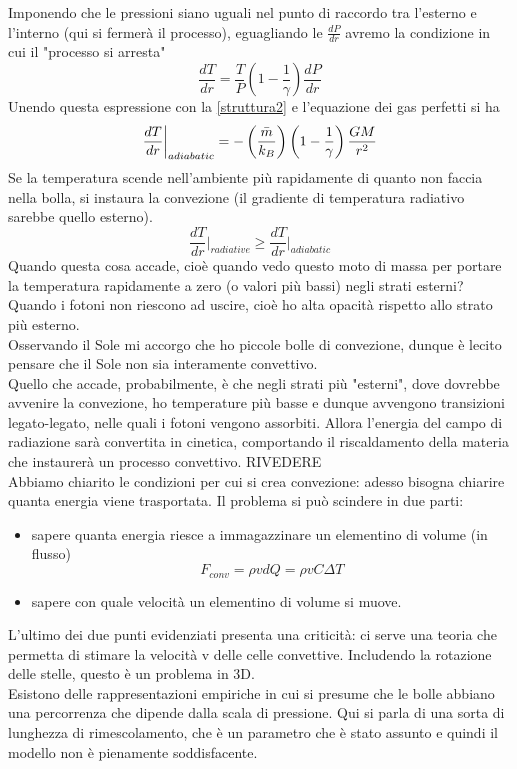 \documentclass[a4paper,11pt]{article}
\begin{document}
Imponendo che le pressioni siano uguali nel punto di raccordo tra l'esterno e l'interno (qui si fermerà il processo), eguagliando le $\frac{dP}{dr}$ avremo la condizione in cui il "processo si arresta"
$$\frac{dT}{dr}=\frac{T}{P}\left(1-\frac{1}{\gamma}\right)\frac{dP}{dr}$$
Unendo questa espressione con la \ref{struttura2} e l'equazione dei gas perfetti si ha
$$ \frac{dT}{dr}\bigg|_{adiabatic}=-\left (\frac{\Bar{m}}{k_B}\right)\left(1-\frac{1}{\gamma}\right)\frac{GM}{r^2}$$
Se la temperatura scende nell'ambiente più rapidamente di quanto non faccia nella bolla, si instaura la convezione (il gradiente di temperatura radiativo sarebbe quello esterno).
$$\frac{dT}{dr}\bigg|_{radiative}\geq \frac{dT}{dr}\bigg|_{adiabatic}$$
Quando questa cosa accade, cioè quando vedo questo moto di massa per portare la temperatura rapidamente a zero (o valori più bassi) negli strati esterni? Quando i fotoni non riescono ad uscire, cioè ho alta opacità rispetto allo strato più esterno.\\
Osservando il Sole mi accorgo che ho piccole bolle di convezione, dunque è lecito pensare che il Sole non sia interamente convettivo.\\
Quello che accade, probabilmente, è che negli strati più "esterni", dove dovrebbe avvenire la convezione, ho temperature più basse e dunque avvengono transizioni legato-legato, nelle quali i fotoni vengono assorbiti. Allora l'energia del campo di radiazione sarà convertita in cinetica, comportando il riscaldamento della materia che instaurerà un processo convettivo. RIVEDERE\\
Abbiamo chiarito le condizioni per cui si crea convezione: adesso bisogna chiarire quanta energia viene trasportata. Il problema si può scindere in due parti:
\begin{itemize}
    \item sapere quanta energia riesce a immagazzinare un elementino di volume (in flusso)
    $$F_{conv}=\rho v dQ=\rho vC\Delta T$$
    \item sapere con quale velocità un elementino di volume si muove.
\end{itemize}
L'ultimo dei due punti evidenziati presenta una criticità: ci serve una teoria che permetta di stimare la velocità v delle celle convettive. Includendo la rotazione delle stelle, questo è un problema in 3D.\\
Esistono delle rappresentazioni empiriche in cui si presume che le bolle abbiano una percorrenza che dipende dalla scala di pressione. Qui si parla di una sorta di lunghezza di rimescolamento, che è un parametro che è stato assunto e quindi il modello non è pienamente soddisfacente.\\
\end{document}
